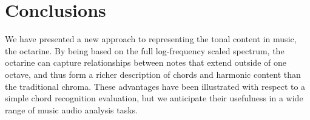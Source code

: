 \documentclass{article}
\begin{document}
\section{Conclusions}\label{sec:conclus}

We have presented a new approach to representing the tonal content in music, 
the octarine.  By being based on the full log-frequency scaled spectrum, the 
octarine can capture relationships between notes that extend outside of one 
octave, and thus form a richer description of chords and harmonic content than 
the traditional chroma.  These advantages have been illustrated with respect to 
a simple chord recognition evaluation, but we anticipate their usefulness in a wide 
range of music audio analysis tasks.


\end{document}
